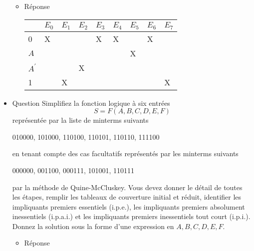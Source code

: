 \documentclass[letter, oneside]{book}
\begin{document}
\begin{itemize}
\begin{itemize}
\item Réponse
\label{sec:orgdabd624}

\begin{center}
\begin{tabular}{lllllllll}
 & \(E_0\) & \(E_1\) & \(E_2\) & \(E_3\) & \(E_4\) & \(E_5\) & \(E_6\) & \(E_7\)\\[0pt]
\hline
0 & X &  &  & X & X &  & X & \\[0pt]
\(A\) &  &  &  &  &  & X &  & \\[0pt]
\(A^{\prime}\) &  &  & X &  &  &  &  & \\[0pt]
1 &  & X &  &  &  &  &  & X\\[0pt]
\end{tabular}
\end{center}

\begin{center}

\end{center}
\end{itemize}

\item Question
\label{sec:orge450ffb}
Simplifiez la fonction logique à six entrées
$$
S = F(A,B,C,D,E,F)
$$
représentée par la liste de minterms suivants

010000, 101000, 110100, 110101, 110110, 111100

en tenant compte des cas facultatifs représentés par les minterms
suivants

000000, 001100, 000111, 101001, 110111

par la méthode de Quine-McCluskey. Vous devez donner le détail de
toutes les étapes, remplir les tableaux de couverture initial et
réduit, identifier les impliquants premiers essentiels (i.p.e.), les
impliquants premiers absolument inessentiels (i.p.a.i.) et les
impliquants premiers inessentiels tout court (i.p.i.). Donnez la
solution sous la forme d'une expression en \(A,B,C,D,E,F\).

\begin{itemize}
\item Réponse
\label{sec:org8a0be10}

\tiny{ %

}
\end{itemize}
\end{itemize}
\end{document}
